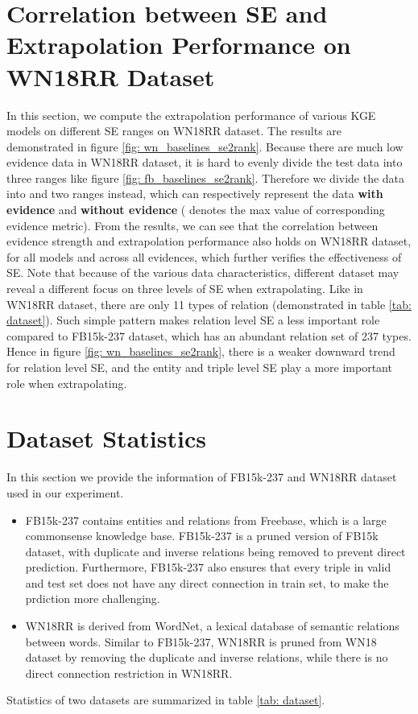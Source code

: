 \documentclass[letterpaper]{article} \usepackage{aaai22}  \usepackage{times}  \usepackage{helvet}  \usepackage{courier}  \usepackage[hyphens]{url}  \usepackage{graphicx} \urlstyle{rm} \def\UrlFont{\rm}  \usepackage{natbib}  \usepackage{caption} \DeclareCaptionStyle{ruled}{labelfont=normalfont,labelsep=colon,strut=off} \frenchspacing  \setlength{\pdfpagewidth}{8.5in}  \setlength{\pdfpageheight}{11in}  \usepackage{algorithm}
\begin{document}
\section{Correlation between SE and Extrapolation Performance on WN18RR Dataset}
\label{ap: wn_baselines_se2rank}
In this section, we compute the extrapolation performance of various KGE models on different SE ranges on WN18RR dataset. The results are demonstrated in figure \ref{fig: wn_baselines_se2rank}. 
Because there are much low evidence data in WN18RR dataset, it is hard to evenly divide the test data into three ranges like figure \ref{fig: fb_baselines_se2rank}. Therefore we divide the data into  and  two ranges instead, which can respectively represent the data \textbf{with evidence} and \textbf{without evidence} ( denotes the max value of corresponding evidence metric). 
From the results, we can see that the correlation between evidence strength and extrapolation performance also holds on WN18RR dataset, for all models and across all evidences, which further verifies the effectiveness of SE.
Note that because of the various data characteristics, different dataset may reveal a different focus on three levels of SE when extrapolating. 
Like in WN18RR dataset, there are only 11 types of relation (demonstrated in table \ref{tab: dataset}). Such simple pattern makes relation level SE a less important role compared to FB15k-237 dataset, which has an abundant relation set of 237 types. Hence in figure \ref{fig: wn_baselines_se2rank}, there is a weaker downward trend for relation level SE, and the entity and triple level SE play a more important role when extrapolating. 

\section{Dataset Statistics}
\label{ap: dataset}
In this section we provide the information of FB15k-237 and WN18RR dataset used in our experiment.
\begin{itemize}
    \item FB15k-237 \cite{2015_Toutanova_FB15k-237} contains entities and relations from Freebase, which is a large commonsense knowledge base. FB15k-237 is a pruned version of FB15k \cite{NeurIPS_2013_Bordes_TransE} dataset, with duplicate and inverse relations being removed to prevent direct prediction. Furthermore, FB15k-237 also ensures that every triple  in valid and test set does not have any direct connection  in train set, to make the prdiction more challenging. 
    \item WN18RR \cite{AAAI_2018_Dettmers_ConvE_WN18RR} is derived from WordNet, a lexical database of semantic relations between words. Similar to FB15k-237, WN18RR is pruned from WN18 \cite{NeurIPS_2013_Bordes_TransE} dataset by removing the duplicate and inverse relations, while there is no direct connection restriction in WN18RR.
\end{itemize}
Statistics of two datasets are summarized in table \ref{tab: dataset}.
\end{document}
